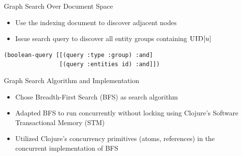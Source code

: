 \documentclass[compress]{beamer}
\newcommand{\prop}[2]{\ensuremath\textsc{#1}[#2]}
\newcommand{\uid}[1]{\prop{UID}{#1}}
\begin{document}
		\begin{frame}[fragile]{Graph Search Over Document Space}
			\begin{itemize}
				\item Use the indexing document to discover adjacent nodes
				\item Issue search query to discover all entity groups containing \(\uid{u}\)
			\end{itemize}
			
			\begin{verbatim}
(boolean-query [[(query :type :group) :and]
                [(query :entities id) :and]])
			\end{verbatim}
		\end{frame}
		
		\begin{frame}{Graph Search Algorithm and Implementation}
			\begin{itemize}
				\item Chose \alert{Breadth-First Search (BFS)} as search algorithm
				\item Adapted BFS to run concurrently without locking using Clojure's \alert{Software Transactional Memory (STM)}
				\item Utilized Clojure's concurrency primitives (atoms, references) in the concurrent implementation of BFS
			\end{itemize}
		\end{frame}
	
\end{document}
